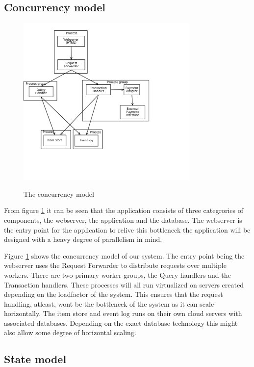 \subsection{Concurrency model}
\label{sec:concurrency-model}

\begin{figure}[h!]
    \centering
    \caption{The concurrency model}
    \includegraphics[width=0.8\textwidth]{figures/concurrency-model}
    \label{fig:concurrency-model}
\end{figure}

From figure \ref{fig:concurrency-model} it can be seen that the application consists of
three categrories of components, the webserver, the application and the database.
The webserver is the entry point for the application to relive this bottleneck
the application will be designed with a heavy degree of parallelism in mind.


Figure \ref{fig:concurrency-model} shows the concurrency model of our system.
The entry point being the webserver uses the Request Forwarder to distribute
requests over multiple workers. There are two primary worker groups, the Query
handlers and the Transaction handlers. These processes will all run virtualized on servers
created depending on the loadfactor of the system. This ensures that the request
handling, atleast, wont be the bottleneck of the system as it can scale
horizontally. The item store and event log runs on their own cloud servers with
associated databases. Depending on the exact database technology this might also
allow some degree of horizontal scaling.


\subsection{State model}
\label{sec:state-model}

